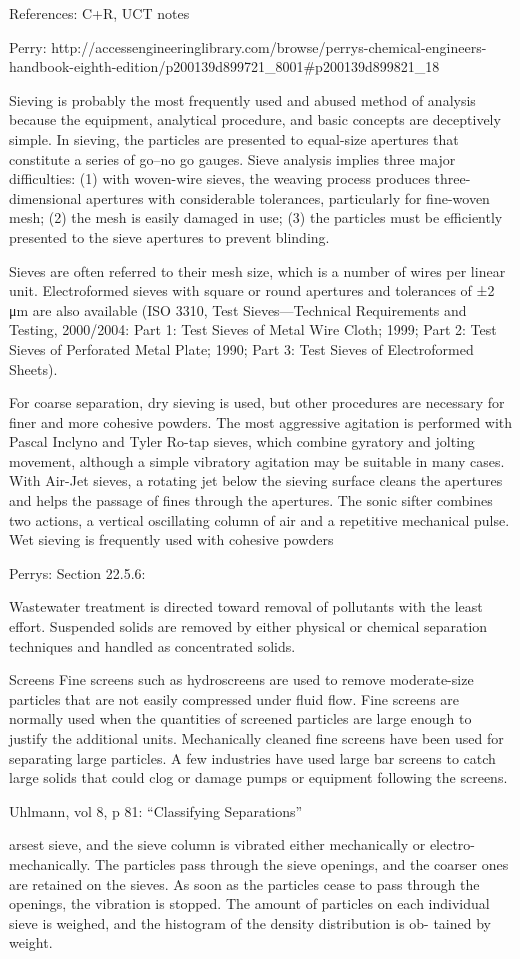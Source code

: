 References: C+R, UCT notes

Perry: http://accessengineeringlibrary.com/browse/perrys-chemical-engineers-handbook-eighth-edition/p200139d899721_8001#p200139d899821_18

Sieving is probably the most frequently used and abused method of analysis because the equipment, analytical procedure, and basic concepts are deceptively simple. In sieving, the particles are presented to equal-size apertures that constitute a series of go–no go gauges. Sieve analysis implies three major difficulties: (1) with woven-wire sieves, the weaving process produces three-dimensional apertures with considerable tolerances, particularly for fine-woven mesh; (2) the mesh is easily damaged in use; (3) the particles must be efficiently presented to the sieve apertures to prevent blinding.

Sieves are often referred to their mesh size, which is a number of wires per linear unit. Electroformed sieves with square or round apertures and tolerances of ±2 μm are also available (ISO 3310, Test Sieves—Technical Requirements and Testing, 2000/2004: Part 1: Test Sieves of Metal Wire Cloth; 1999; Part 2: Test Sieves of Perforated Metal Plate; 1990; Part 3: Test Sieves of Electroformed Sheets).

For coarse separation, dry sieving is used, but other procedures are necessary for finer and more cohesive powders. The most aggressive agitation is performed with Pascal Inclyno and Tyler Ro-tap sieves, which combine gyratory and jolting movement, although a simple vibratory agitation may be suitable in many cases. With Air-Jet sieves, a rotating jet below the sieving surface cleans the apertures and helps the passage of fines through the apertures. The sonic sifter combines two actions, a vertical oscillating column of air and a repetitive mechanical pulse. Wet sieving is frequently used with cohesive powders

Perrys: Section 22.5.6:

Wastewater treatment is directed toward removal of pollutants with the least effort. Suspended solids are removed by either physical or chemical separation techniques and handled as concentrated solids.

Screens Fine screens such as hydroscreens are used to remove moderate-size particles that are not easily compressed under fluid flow. Fine screens are normally used when the quantities of screened particles are large enough to justify the additional units. Mechanically cleaned fine screens have been used for separating large particles. A few industries have used large bar screens to catch large solids that could clog or damage pumps or equipment following the screens.

Uhlmann, vol 8, p 81: ``Classifying Separations''

arsest sieve, and the sieve column is vibrated either mechanically or electro-mechanically. The particles pass through the sieve openings, and the coarser ones are retained on the sieves. As soon as the particles cease to pass through the openings, the vibration is stopped. The amount of particles on each individual sieve is weighed, and the histogram of the density distribution is ob- tained by weight.